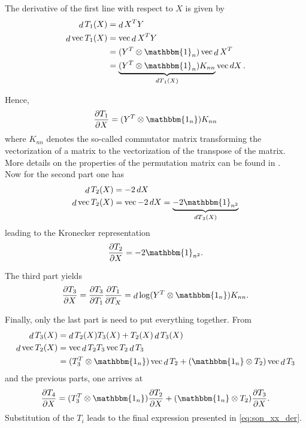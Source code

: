 The derivative of the first line with respect to $X$ is given by
\begin{align}
\mathop{d}T_1(X)&=\mathop{d}X^TY\\
\mathop{d}\operatorname{vec}T_1(X)&= \operatorname{vec}\mathop{d}X^TY\\
			&=(Y^T\otimes\mathbbm{1}_n)  \operatorname{vec}\mathop{d}X^T\\
			&=\underbrace{(Y^T\otimes\mathbbm{1}_n)K_{nn}}_{\mathop{dT}_1(X)}  \operatorname{vec}\mathop{dX}.
\end{align}

Hence, 
\begin{equation}
\frac{\partial T_1}{\partial X} = (Y^T\otimes\mathbbm{1_n})K_{nn}
\end{equation}
where $K_{nn}$ denotes the so-called commutator matrix transforming the vectorization
of a matrix to the vectorization of the transpose of the matrix. More details
on the properties of the permutation matrix can be found in \cite{Magnus}.\\

Now for the second part one has
\begin{align}
\mathop{d}T_2(X)&=-2\mathop{dX}\\
\mathop{d}\operatorname{vec}T_2(X)&= \operatorname{vec}-2\mathop{dX} = \underbrace{-2\mathbbm{1}_{n^2}}_{\mathop{dT}_2(X)}
\end{align}
leading to the Kronecker representation
\begin{equation}
\frac{\partial T_2}{\partial X} = -2\mathbbm{1}_{n^2}.
\end{equation}

The third part yields
\begin{equation}
\frac{\partial T_3}{\partial X} = \frac{\partial T_3}{\partial T_1}\frac{\partial T_1}{\partial T_X}=
\mathop{d}\log(Y^T\otimes\mathbbm{1_n})K_{nn}.
\end{equation}

Finally, only the last part is need to put everything together. From 
\begin{align}
\mathop{d}T_3(X)&=\mathop{d}T_2(X)T_3(X)+T_2(X)\mathop{d}T_3(X)\\
\mathop{d}\operatorname{vec}T_2(X)&=\operatorname{vec}\mathop{d}T_2T_3
\operatorname{vec}T_2\mathop{d}T_3\\
&=(T_3^T\otimes\mathbbm{1_n})\operatorname{vec}\mathop{d}T_2 + 
(\mathbbm{1_n}\otimes T_2)\operatorname{vec}\mathop{d}T_3
\end{align}
and the previous parts, one arrives at 
\begin{equation}
\frac{\partial T_4}{\partial X} = (T_3^T\otimes\mathbbm{1_n})\frac{\partial T_2}{\partial X} + 
(\mathbbm{1_n}\otimes T_2)\frac{\partial T_3}{\partial X}.
\end{equation}
Substitution of the $T_i$ leads to the final expression presented in \ref{eq:son_xx_der}.










